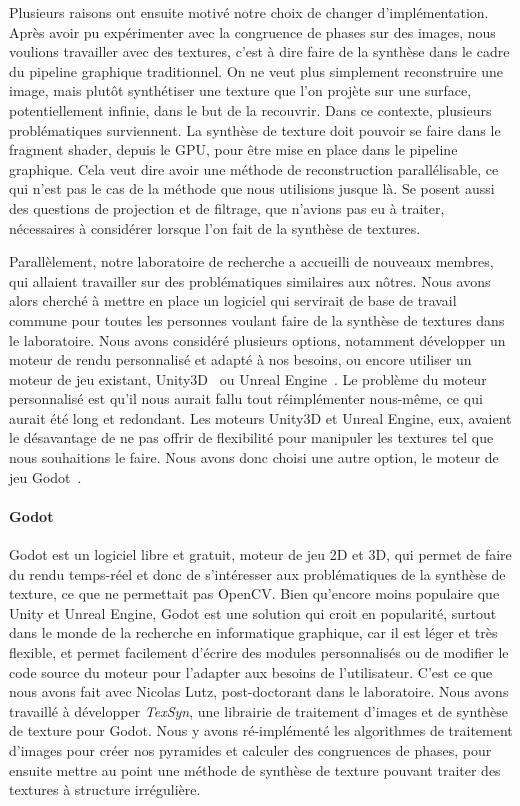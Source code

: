 \bigskip

Plusieurs raisons ont ensuite motivé notre choix de changer d'implémentation. Après avoir pu expérimenter avec la congruence de phases sur des images, nous voulions travailler avec des textures, c'est à dire faire de la synthèse dans le cadre du pipeline graphique traditionnel. On ne veut plus simplement reconstruire une image, mais plutôt synthétiser une texture que l'on projète sur une surface, potentiellement infinie, dans le but de la recouvrir. Dans ce contexte, plusieurs problématiques surviennent. La synthèse de texture doit pouvoir se faire dans le fragment shader, depuis le GPU, pour être mise en place dans le pipeline graphique. Cela veut dire avoir une méthode de reconstruction parallélisable, ce qui n'est pas le cas de la méthode que nous utilisions jusque là. Se posent aussi des questions de projection et de filtrage, que n'avions pas eu à traiter, nécessaires à considérer lorsque l'on fait de la synthèse de textures.

Parallèlement, notre laboratoire de recherche a accueilli de nouveaux membres, qui allaient travailler sur des problématiques similaires aux nôtres. Nous avons alors cherché à mettre en place un logiciel qui servirait de base de travail commune pour toutes les personnes voulant faire de la synthèse de textures dans le laboratoire. Nous avons considéré plusieurs options, notamment développer un moteur de rendu personnalisé et adapté à nos besoins, ou encore utiliser un moteur de jeu existant, Unity3D~\cite{unity_engine} ou Unreal Engine~\cite{unreal_engine}. Le problème du moteur personnalisé est qu'il nous aurait fallu tout réimplémenter nous-même, ce qui aurait été long et redondant. Les moteurs Unity3D et Unreal Engine, eux, avaient le désavantage de ne pas offrir de flexibilité pour manipuler les textures tel que nous souhaitions le faire. Nous avons donc choisi une autre option, le moteur de jeu Godot~\cite{godot_game_engine}.

\paragraph{Godot}

Godot est un logiciel libre et gratuit, moteur de jeu 2D et 3D, qui permet de faire du rendu temps-réel et donc de s'intéresser aux problématiques de la synthèse de texture, ce que ne permettait pas OpenCV. Bien qu'encore moins populaire que Unity et Unreal Engine, Godot est une solution qui croit en popularité, surtout dans le monde de la recherche en informatique graphique, car il est léger et très flexible, et permet facilement d'écrire des modules personnalisés ou de modifier le code source du moteur pour l'adapter aux besoins de l'utilisateur. C'est ce que nous avons fait avec Nicolas Lutz, post-doctorant dans le laboratoire. Nous avons travaillé à développer \textit{TexSyn}, une librairie \cpp de traitement d'images et de synthèse de texture pour Godot. Nous y avons ré-implémenté les algorithmes de traitement d'images pour créer nos pyramides et calculer des congruences de phases, pour ensuite mettre au point une méthode de synthèse de texture pouvant traiter des textures à structure irrégulière.

